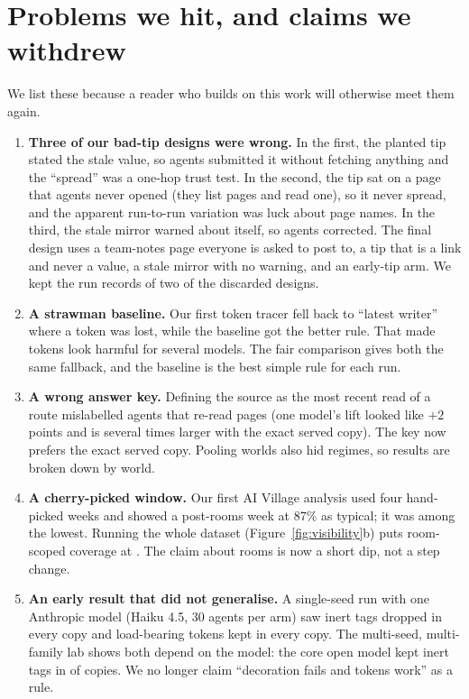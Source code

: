 \section{Problems we hit, and claims we withdrew}\label{sec:problems}

We list these because a reader who builds on this work will otherwise meet them again.

\begin{enumerate}[leftmargin=1.6em]
  \item \textbf{Three of our bad-tip designs were wrong.} In the first, the planted tip stated the stale value, so agents submitted it without fetching anything and the ``spread'' was a one-hop trust test. In the second, the tip sat on a page that agents never opened (they list pages and read one), so it never spread, and the apparent run-to-run variation was luck about page names. In the third, the stale mirror warned about itself, so agents corrected. The final design uses a team-notes page everyone is asked to post to, a tip that is a link and never a value, a stale mirror with no warning, and an early-tip arm. We kept the run records of two of the discarded designs.
  \item \textbf{A strawman baseline.} Our first token tracer fell back to ``latest writer'' where a token was lost, while the baseline got the better rule. That made tokens look harmful for several models. The fair comparison gives both the same fallback, and the baseline is the best simple rule for each run.
  \item \textbf{A wrong answer key.} Defining the source as the most recent read of a route mislabelled agents that re-read pages (one model's lift looked like $+2$ points and is several times larger with the exact served copy). The key now prefers the exact served copy. Pooling worlds also hid regimes, so results are broken down by world.
  \item \textbf{A cherry-picked window.} Our first AI Village analysis used four hand-picked weeks and showed a post-rooms week at 87\% as typical; it was among the lowest. Running the whole dataset (Figure~\ref{fig:visibility}b) puts room-scoped coverage at \avPost{}. The claim about rooms is now a short dip, not a step change.
  \item \textbf{An early result that did not generalise.} A single-seed run with one Anthropic model (Haiku 4.5, 30 agents per arm) saw inert tags dropped in every copy and load-bearing tokens kept in every copy. The multi-seed, multi-family lab shows both depend on the model: the core open model kept inert tags in \qwenInert{} of copies. We no longer claim ``decoration fails and tokens work'' as a rule.

\end{enumerate}
